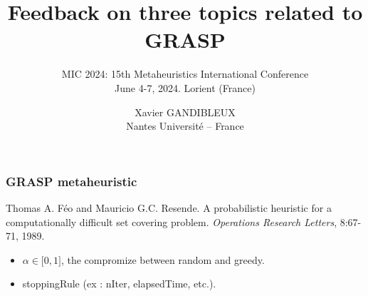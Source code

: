 \documentclass[10pt,xcolor=dvipsnames]{beamer}
\title{\large Feedback on three topics related to GRASP}
\subtitle{\scriptsize{MIC 2024: 15th Metaheuristics International Conference \vspace{-2mm}\\
June 4-7, 2024. Lorient (France) \vspace{1mm}
}}
\date{}
\author{Xavier GANDIBLEUX\\ Nantes Université -- France
}
\begin{document}
\maketitle



\begin{frame}
  \frametitle{GRASP metaheuristic}
\vspace{3mm}

 
Thomas A. Féo and Mauricio G.C. Resende.  
A probabilistic heuristic for a computationally difficult set covering problem.
\textit{Operations  Research  Letters}, 8:67-71, 1989.


\vspace{4mm}

\vspace{1.5mm}

\begin{itemize}
\item   $\alpha \in \mbox{[}0,1\mbox{]}$, the compromize between  random and  greedy.%
\item stoppingRule (ex : nIter, elapsedTime, etc.).
\end{itemize}

\end{frame}
\end{document}
